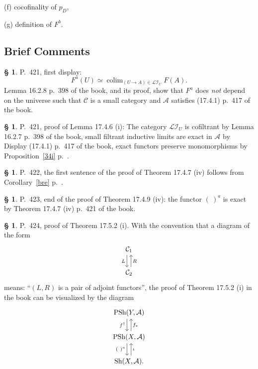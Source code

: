 \documentclass[12pt]{article}
\theoremstyle{remark}
\theoremstyle{definition}
\newtheorem{s}[thm]{\S}
\newcommand{\nn}{\noindent}
\newcommand{\cc}{\mathcal}
\newcommand{\oo}{\operatorname}
\newcommand{\A}{\mathcal A}
\newcommand{\C}{\mathcal C}
\DeclareMathOperator*{\colim}{colim}
\begin{document}
\nn(f) cocofinality of $p_D$, 

\nn(g) definition of $F^b$. 


\subsection{Brief Comments}

\begin{s}\label{fau}
P.~421, first display: 
$$
F^a(U)\simeq\colim_{(U\to A)\in\cc{LI}_U}F(A).
$$ 
Lemma 16.2.8 p.~398 of the book, and its proof, show that $F^a$ does {\em not} depend on the universe such that $\C$ is a small category and $\A$ satisfies (17.4.1) p.~417 of the book.
\end{s}

%

\begin{s}P.~421, proof of Lemma 17.4.6 (i): The category $\cc{LI}_U$ is cofiltrant by Lemma 16.2.7 p.~398 of the book, small filtrant inductive limits are exact in $\A$ by Display (17.4.1) p.~417 of the book, exact functors preserve monomorphisms by Proposition~\ref{34i} p.~\pageref{34i}.
\end{s}

%

\begin{s} 
P.~422, the first sentence of the proof of Theorem 17.4.7 (iv) follows from Corollary~\ref{bre} p.~\pageref{bre}. 
\end{s}

%

\begin{s} 
P.~423, end of the proof of Theorem 17.4.9 (iv): the functor $(\ )^a$ is exact by Theorem 17.4.7 (iv) p.~421 of the book.
\end{s}

%

\begin{s} 
P.~424, proof of Theorem 17.5.2 (i). With the convention that a diagram of the form 
$$
\begin{tikzcd} 
\C_1\ar[xshift=-0.7ex]{d}[swap]{L}\\ \C_2\ar[xshift=0.7ex]{u}[swap]{R}
\end{tikzcd}
$$ 
means: ``$(L,R)$ is a pair of adjoint functors'', the proof of Theorem 17.5.2 (i) in the book can be visualized by the diagram 
$$
\begin{tikzcd} 
\oo{PSh}(Y,\A)\ar[xshift=-0.7ex]{d}[swap]{f^\dagger}\\ 
\oo{PSh}(X,\A)\ar[xshift=0.7ex]{u}[swap]{f_*}\ar[xshift=-0.7ex]{d}[swap]{(\ )^a}\\ 
\oo{Sh}(X,\A).\ar[xshift=0.7ex]{u}[swap]{\iota}
\end{tikzcd}
$$ 
\end{s}
\end{document}

